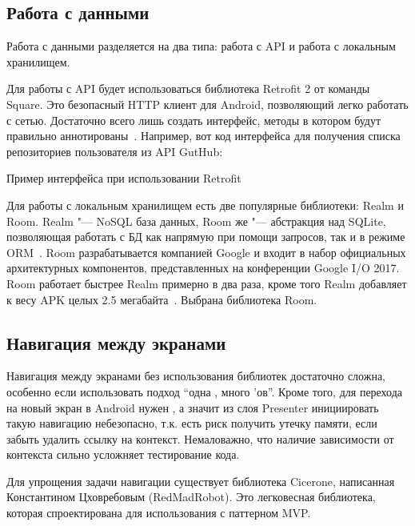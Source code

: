 \subsection{Работа с данными}
\label{subsec:workWithData}
Работа с данными разделяется на два типа: работа с API и работа с локальным хранилищем.

Для работы с API будет использоваться библиотека Retrofit 2 от команды Square.
Это безопасный HTTP клиент для Android, позволяющий легко работать с сетью.
Достаточно всего лишь создать интерфейс, методы в котором будут правильно аннотированы~\cite{retrofit}.
Например, вот код интерфейса для получения списка репозиториев пользователя из API GutHub:

\begin{listing}[H]
  \caption{Пример интерфейса при использовании Retrofit}
  \label{lst:retrofitKt}
\end{listing}

Для работы с локальным хранилищем есть две популярные библиотеки: Realm и Room.
Realm "--- NoSQL база данных, Room же "--- абстракция над SQLite, позволяющая работать с БД как напрямую при помощи запросов, так и в режиме ORM~\cite{realm,android:room}.
Room разрабатывается компанией Google и входит в набор официальных архитектурных компонентов, представленных на конференции Google I/O 2017.
Room работает быстрее Realm примерно в два раза, кроме того Realm добавляет к весу APK целых 2.5 мегабайта~\cite{github:dbBench}.
Выбрана библиотека Room.

\subsection{Навигация между экранами}
\label{subsec:navigation}
Навигация между экранами без использования библиотек достаточно сложна, особенно если использовать подход ``одна , много 'ов''.
Кроме того, для перехода на новый экран в Android нужен , а значит из слоя Presenter инициировать такую навигацию небезопасно, т.к. есть риск получить утечку памяти, если забыть удалить ссылку на контекст.
Немаловажно, что наличие зависимости от контекста сильно усложняет тестирование кода.

Для упрощения задачи навигации существует библиотека Cicerone, написанная Константином Цховребовым (RedMadRobot).
Это легковесная библиотека, которая спроектирована для использования с паттерном MVP\@.


